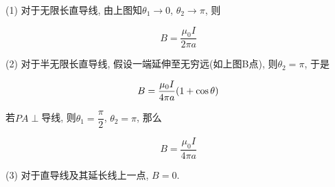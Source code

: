 \begin{note}
	
	(1) 对于无限长直导线, 由上图知$\theta_1 \to 0$, $\theta_2 \to \pi$, 则
	
	\begin{equation*}
		B = \dfrac{\mu_0 I}{2 \pi a}
	\end{equation*}
	
	(2) 对于半无限长直导线, 假设一端延伸至无穷远(如上图B点), 则$\theta_2 = \pi$, 于是
	
	\begin{equation*}
		B = \dfrac{\mu_0 I}{4 \pi a} \qty(1 + \cos \theta) 
	\end{equation*}
		
	若$PA \perp$导线, 则$\theta_1 = \dfrac{\pi}{2}$, $\theta_2 = \pi$, 那么
	
	\begin{equation*}
		B = \dfrac{\mu_0 I}{4 \pi a}
	\end{equation*}
	
	(3) 对于直导线及其延长线上一点, $B = 0$.
	
\end{note}

